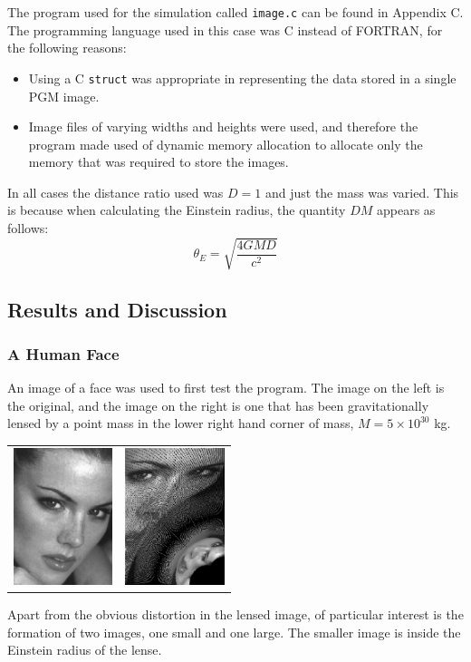 \documentclass[a4paper]{IEEEtran}
\begin{document}
    The program used for the simulation called \texttt{image.c} can
    be found in Appendix C. The programming language used in this case
    was C instead of FORTRAN, for the following reasons:
    \begin{itemize}
        \item Using a C \texttt{struct} was appropriate in representing
              the data stored in a single PGM image.
        \item Image files of varying widths and heights were used, and 
              therefore the program made used of dynamic memory allocation
              to allocate only the memory that was required to store
              the images.
    \end{itemize}

    In all cases the distance ratio used was $D = 1$ and just the mass
    was varied. This is because when calculating the Einstein radius,
    the quantity $DM$ appears as follows:
    \begin{equation}
        \theta_E = \sqrt{\frac{4GMD}{c^2}}
    \end{equation}

\subsection{Results and Discussion}

\subsubsection{A Human Face}
An image of a face was used to first test the program. The image on the
left is the original, and the image on the right is one that has been
gravitationally lensed by a point mass in the lower right hand corner
of mass, $M = 5 \times 10^{30}$ kg.
\begin{center}
    \begin{tabular}{cc}
        \includegraphics[height=4cm]{pics/kr.eps} &
        \includegraphics[height=4cm]{pics/kr_5e30.eps} \\
    \end{tabular}
\end{center}
Apart from the obvious distortion in the lensed image, of particular
interest is the formation of two images, one small and one large.
The smaller image is inside the Einstein radius of the lense.
\end{document}
